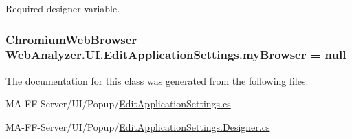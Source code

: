 Required designer variable. 

\hypertarget{class_web_analyzer_1_1_u_i_1_1_edit_application_settings_a13a4f8fb22ec5f36f5824f489231ed85}{}
\subsubsection[{my\+Browser}]{\setlength{\rightskip}{0pt plus 5cm}Chromium\+Web\+Browser Web\+Analyzer.\+U\+I.\+Edit\+Application\+Settings.\+my\+Browser = null\hspace{0.3cm}{\ttfamily [private]}}\label{class_web_analyzer_1_1_u_i_1_1_edit_application_settings_a13a4f8fb22ec5f36f5824f489231ed85}


The documentation for this class was generated from the following files\+:\begin{DoxyCompactItemize}
\item 
M\+A-\/\+F\+F-\/\+Server/\+U\+I/\+Popup/\hyperlink{_edit_application_settings_8cs}{Edit\+Application\+Settings.\+cs}\item 
M\+A-\/\+F\+F-\/\+Server/\+U\+I/\+Popup/\hyperlink{_edit_application_settings_8_designer_8cs}{Edit\+Application\+Settings.\+Designer.\+cs}\end{DoxyCompactItemize}
